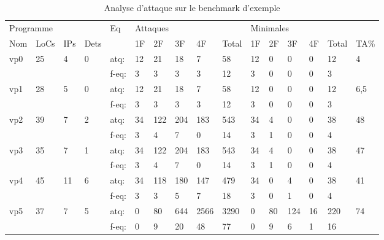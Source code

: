                 \begin{table}[p]
                    \scriptsize
                        \caption{Analyse d'attaque sur le benchmark d'exemple}\label{tbl:ch3:exp:fissc-results}
                    \begin{center}
                        \setlength\tabcolsep{3pt}
                        \begin{tabular}{llll|llllll|lllll|l}
                        \multicolumn{4}{l|}{Programme} & Eq & \multicolumn{5}{l|}{Attaques} & \multicolumn{5}{l|}{Minimales} &  \\
                        Nom & LoCs & IPs & Dets &  & 1F & 2F & 3F & 4F & Total & 1F & 2F & 3F & 4F & Total & TA\% \\
                        \hline
                        \hline
                        vp0 & 25 & 4 & 0 & atq: & 12 & 21 & 18 & 7 & 58 & 12 & 0 & 0 & 0 & 12 & 4 \\
                         &  &  &  & f-eq: & 3 & 3 & 3 & 3 & 12 & 3 & 0 & 0 & 0 & 3 &  \\
                        \hline
                        vp1 & 28 & 5 & 0 & atq: & 12 & 21 & 18 & 7 & 58 & 12 & 0 & 0 & 0 & 12 & 6,5 \\
                         &  &  &  & f-eq: & 3 & 3 & 3 & 3 & 12 & 3 & 0 & 0 & 0 & 3 &  \\
                        \hline
                        vp2 & 39 & 7 & 2 & atq: & 34 & 122 & 204 & 183 & 543 & 34 & 4 & 0 & 0 & 38 & 48 \\
                         &  &  &  & f-eq: & 3 & 4 & 7 & 0 & 14 & 3 & 1 & 0 & 0 & 4 &  \\
                        \hline
                        vp3 & 35 & 7 & 1 & atq: & 34 & 122 & 204 & 183 & 543 & 34 & 4 & 0 & 0 & 38 & 47 \\
                         &  &  &  & f-eq: & 3 & 4 & 7 & 0 & 14 & 3 & 1 & 0 & 0 & 4 &  \\
                        \hline
                        vp4 & 45 & 11 & 6 & atq: & 34 & 118 & 180 & 147 & 479 & 34 & 0 & 4 & 0 & 38 & 41 \\
                         &  &  &  & f-eq: & 3 & 3 & 5 & 7 & 18 & 3 & 0 & 1 & 0 & 4 &  \\
                        \hline
                        vp5 & 37 & 7 & 5 & atq: & 0 & 80 & 644 & 2566 & 3290 & 0 & 80 & 124 & 16 & 220 & 74 \\
                         &  &  &  & f-eq: & 0 & 9 & 20 & 48 & 77 & 0 & 9 & 6 & 1 & 16 &  \\

\end{tabular}
\end{center}
\end{table}

